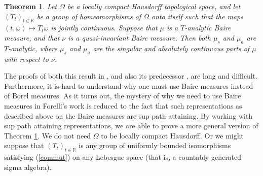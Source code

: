 \documentclass[12pt]{article}
\newcommand{\R}{\mathbb R}
\newtheorem{thm}[defin]{Theorem}
\begin{document}
\begin{thm}
\label{forelli}
Let $\Omega$ be a locally compact Hausdorff 
topological space, and let $(T_t)_{t\in \R}$ 
be a group of homeomorphisms of $\Omega$ onto itself such that the maps 
$(t,\omega) \mapsto T_t \omega$ is jointly continuous.  Suppose that
$\mu$ is a $T$-analytic Baire measure, and that $\nu$ is a quasi-invariant
Baire measure.  Then both $\mu_s$ and $\mu_a$ are $T$-analytic, where $\mu_s$
and $\mu_a$ are the singular and absolutely continuous parts of $\mu$ with respect
to $\nu$.
\end{thm}

The proofs of both this result in \cite{forelli}, and also its predecessor
\cite{deleeuwglicksberg},
are long and difficult.  Furthermore, it is hard to understand
why one must use Baire measures instead of Borel measures.
As it turns out, the mystery of why we need to use Baire measures in Forelli's work is reduced to the fact that
such representations as described above on the Baire measures are sup path attaining.  By working with sup path attaining representations,
we are able to prove a more general version of Theorem \ref{forelli}.
We do not need $\Omega$ to be locally compact Hausdorff.  
Or
we might suppose that $(T_t)_{t\in \R}$ is any group of uniformly bounded
isomorphisms satisfying (\ref{commut}) on any Lebesgue space (that is, a 
countably generated sigma algebra).  

\end{document}
